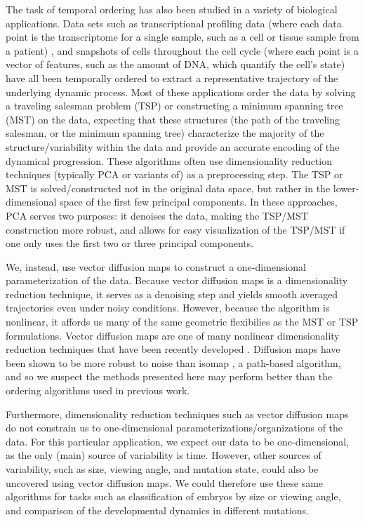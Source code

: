 \documentclass{pnastwo}
\begin{document}
\begin{article}
The task of temporal ordering has also been studied in a variety of biological applications. 
%
Data sets such as  transcriptional profiling data (where each data point is the transcriptome for a single sample, such as a cell or tissue sample from a patient) \cite{anavy2014blind, trapnell2014dynamics,gupta2008extracting, qiu2011discovering}, and snapshots of cells throughout the cell cycle (where each point is a vector of features, such as the amount of DNA, which quantify the cell's state)  \cite{kafri2013dynamics} have all been temporally ordered to extract a representative trajectory of the underlying dynamic process.
%
Most of these applications order the data by solving a traveling salesman problem (TSP) or constructing a minimum spanning tree (MST) on the data,
expecting that these structures (the path of the traveling salesman, or the minimum spanning tree) characterize the majority of the structure/variability within the data and provide an accurate encoding of the dynamical progression.
%
These algorithms often use dimensionality reduction techniques (typically PCA or variants of) as a preprocessing step.
%
The TSP or MST is solved/constructed not in the original data space, but rather in the lower-dimensional space of the first few principal components.
%
In these approaches, PCA serves two purposes: it denoises the data, making the TSP/MST construction more robust, and allows for easy visualization of the TSP/MST if one only uses the first two or three principal components.

We, instead, use vector diffusion maps to construct a one-dimensional parameterization of the data.
%
Because vector diffusion maps is a dimensionality reduction technique, it serves as a denoising step and yields smooth averaged trajectories even under noisy conditions. 
%
However, because the algorithm is nonlinear, it affords us many of the same geometric flexibilies as the MST or TSP formulations. 
%
Vector diffusion maps are one of many nonlinear dimensionality reduction techniques that have been recently developed \cite{Belkin2003, tenenbaum2000global, Donoho2003, Roweis2000}.
%
Diffusion maps have been shown to be more robust to noise than isomap \cite{balasubramanian2002isomap}, a path-based algorithm, and so we suspect the methods presented here may perform better than the ordering algorithms used in previous work.

Furthermore, dimensionality reduction techniques such as vector diffusion maps do not constrain us to one-dimensional parameterizations/organizations of the data.
%
For this particular application, we expect our data to be one-dimensional, as the only (main) source of variability is time.
%
However, other sources of variability, such as size, viewing angle, and mutation state, could also be uncovered using vector diffusion maps.
%
We could therefore use these same algorithms for tasks such as classification of embryos by size or viewing angle, and comparison of the developmental dynamics in different mutations.


\end{article}
\end{document}

